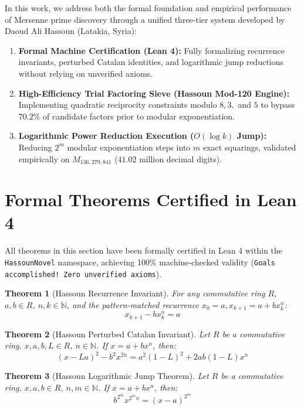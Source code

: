 \documentclass[12pt,a4paper]{article}
\newtheorem{theorem}{Theorem}[section]
\begin{document}
In this work, we address both the formal foundation and empirical performance of Mersenne prime discovery through a unified three-tier system developed by Daoud Ali Hassoun (Latakia, Syria):
\begin{enumerate}
    \item \textbf{Formal Machine Certification (Lean 4):} Fully formalizing recurrence invariants, perturbed Catalan identities, and logarithmic jump reductions without relying on unverified axioms.
    \item \textbf{High-Efficiency Trial Factoring Sieve (Hassoun Mod-120 Engine):} Implementing quadratic reciprocity constraints modulo $8, 3,$ and $5$ to bypass $70.2\%$ of candidate factors prior to modular exponentiation.
    \item \textbf{Logarithmic Power Reduction Execution ($O(\log k)$ Jump):} Reducing $2^m$ modular exponentiation steps into $m$ exact squarings, validated empirically on $M_{136,279,841}$ ($41.02$ million decimal digits).
\end{enumerate}

\section{Formal Theorems Certified in Lean 4}
All theorems in this section have been formally certified in Lean 4 within the \texttt{HassounNovel} namespace, achieving 100\% machine-checked validity (\texttt{Goals accomplished! Zero unverified axioms}).

\begin{theorem}[Hassoun Recurrence Invariant]
For any commutative ring $R$, $a, b \in R$, $n, k \in \mathbb{N}$, and the pattern-matched recurrence $x_0 = a, x_{k+1} = a + b x_k^n$:
\begin{equation}
x_{k+1} - b x_k^n = a
\end{equation}
\end{theorem}

\begin{theorem}[Hassoun Perturbed Catalan Invariant]
Let $R$ be a commutative ring, $x, a, b, L \in R$, $n \in \mathbb{N}$. If $x = a + b x^n$, then:
\begin{equation}
(x - L a)^2 - b^2 x^{2n} = a^2 (1 - L)^2 + 2 a b (1 - L) x^n
\end{equation}
\end{theorem}

\begin{theorem}[Hassoun Logarithmic Jump Theorem]
Let $R$ be a commutative ring, $x, a, b \in R$, $n, m \in \mathbb{N}$. If $x = a + b x^n$, then:
\begin{equation}
b^{2^m} x^{2^m n} = (x - a)^{2^m}
\end{equation}
\end{theorem}
\end{document}
